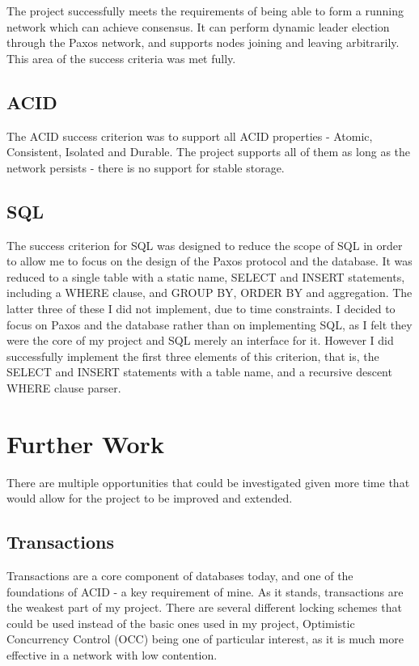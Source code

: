 \documentclass[12pt,twoside,notitlepage]{report}
\begin{document}
The project successfully meets the requirements of being able to form a running network which can
achieve consensus. It can perform dynamic leader election through the Paxos network, and
supports nodes joining and leaving arbitrarily. This area of the success criteria was met fully.

\subsection{ACID}

The ACID success criterion was to support all ACID properties - Atomic, Consistent, Isolated and
Durable. The project supports all of them as long as the network persists - there is no support
for stable storage.

\subsection{SQL}

The success criterion for SQL was designed to reduce the scope of SQL in order to allow me to
focus on the design of the Paxos protocol and the database. It was reduced to a single table with
a static name, SELECT and INSERT statements, including a WHERE clause, and GROUP BY, ORDER BY and
aggregation. The latter three of these I did not implement, due to time constraints. I decided to
focus on Paxos and the database rather than on implementing SQL, as I felt they were the core of
my project and SQL merely an interface for it. However I did successfully implement the first
three elements of this criterion, that is, the SELECT and INSERT statements with a table name, and
a recursive descent WHERE clause parser.

\section{Further Work}

There are multiple opportunities that could be investigated given more time that would allow for
the project to be improved and extended.

\subsection{Transactions}

Transactions are a core component of databases today, and one of the foundations of ACID - a key
requirement of mine. As it stands, transactions are the weakest part of my project. There are
several different locking schemes that could be used instead of the basic ones used in my project,
Optimistic Concurrency Control (OCC) being one of particular interest, as it is much more
effective in a network with low contention.
\end{document}
